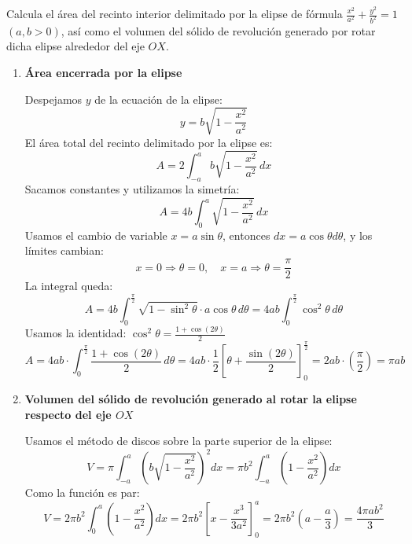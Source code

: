 \documentclass[12pt]{article}
\begin{document}
 \begin{ejercicio}
    Calcula el área del recinto interior delimitado por la elipse de fórmula $\frac{x^2}{a^2}+\frac{y^2}{b^2} = 1$ $(a,b>0)$, así como el volumen del sólido de revolución generado por rotar dicha elipse alrededor del eje $OX$.
    
    \begin{enumerate}[label=\alph*)]
        \item \textbf{Área encerrada por la elipse}

        Despejamos $y$ de la ecuación de la elipse:
        \[
            y = b \sqrt{1 - \frac{x^2}{a^2}}
        \]
        El área total del recinto delimitado por la elipse es:
        \[
            A = 2 \int_{-a}^{a} b \sqrt{1 - \frac{x^2}{a^2}} \, dx
        \]
        Sacamos constantes y utilizamos la simetría:
        \[
            A = 4b \int_{0}^{a} \sqrt{1 - \frac{x^2}{a^2}} \, dx
        \]
        Usamos el cambio de variable \( x = a \sin\theta \), entonces \( dx = a \cos\theta d\theta \), y los límites cambian:
        \[
            x = 0 \Rightarrow \theta = 0, \quad x = a \Rightarrow \theta = \frac{\pi}{2}
        \]
        La integral queda:
        \[
            A = 4b \int_{0}^{\frac{\pi}{2}} \sqrt{1 - \sin^2\theta} \cdot a \cos\theta \, d\theta = 4ab \int_{0}^{\frac{\pi}{2}} \cos^2\theta \, d\theta
        \]
        Usamos la identidad: \( \cos^2\theta = \frac{1 + \cos(2\theta)}{2} \)
        \[
            A = 4ab \cdot \int_{0}^{\frac{\pi}{2}} \frac{1 + \cos(2\theta)}{2} \, d\theta = 4ab \cdot \frac{1}{2} \left[\theta + \frac{\sin(2\theta)}{2} \right]_0^{\frac{\pi}{2}} = 2ab \cdot \left( \frac{\pi}{2} \right) = \boxed{\pi ab}
        \]

        \item \textbf{Volumen del sólido de revolución generado al rotar la elipse respecto del eje $OX$}

        Usamos el método de discos sobre la parte superior de la elipse:
        \[
            V = \pi \int_{-a}^{a} \left( b \sqrt{1 - \frac{x^2}{a^2}} \right)^2 dx = \pi b^2 \int_{-a}^{a} \left(1 - \frac{x^2}{a^2} \right) dx
        \]
        Como la función es par:
        \[
            V = 2\pi b^2 \int_{0}^{a} \left(1 - \frac{x^2}{a^2} \right) dx = 2\pi b^2 \left[ x - \frac{x^3}{3a^2} \right]_0^a = 2\pi b^2 \left(a - \frac{a}{3} \right) = \boxed{\frac{4\pi a b^2}{3}}
        \]
    \end{enumerate}
\end{ejercicio}
\end{document}
